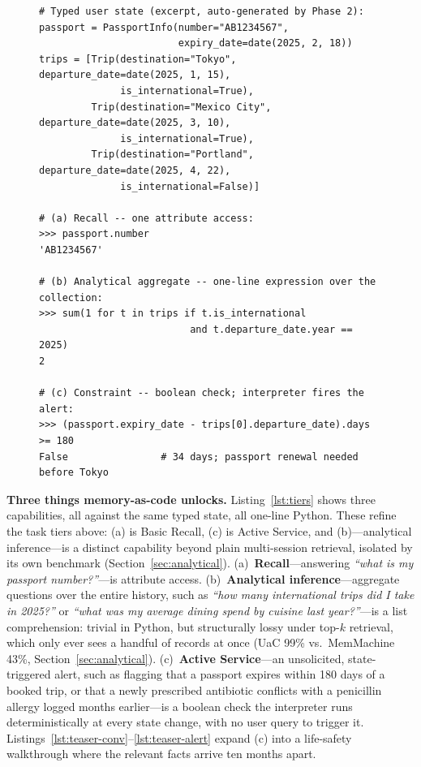 \begin{figure}[htbp]
\begin{lstlisting}[caption={Three capabilities UaC provides, all against the same auto-generated typed state. (a)~Recall is attribute access---what every memory system gives you. (b)~Analytical aggregate is a one-line expression---where retrieval-based systems collapse (Section~\ref{sec:analytical}). (c)~Constraint is a boolean check the interpreter fires on every state change---the basis of the proactive alerts in Section~\ref{sec:active-service}.},label={lst:tiers}]
# Typed user state (excerpt, auto-generated by Phase 2):
passport = PassportInfo(number="AB1234567",
                        expiry_date=date(2025, 2, 18))
trips = [Trip(destination="Tokyo",       departure_date=date(2025, 1, 15),
              is_international=True),
         Trip(destination="Mexico City", departure_date=date(2025, 3, 10),
              is_international=True),
         Trip(destination="Portland",    departure_date=date(2025, 4, 22),
              is_international=False)]

# (a) Recall -- one attribute access:
>>> passport.number
'AB1234567'

# (b) Analytical aggregate -- one-line expression over the collection:
>>> sum(1 for t in trips if t.is_international
                          and t.departure_date.year == 2025)
2

# (c) Constraint -- boolean check; interpreter fires the alert:
>>> (passport.expiry_date - trips[0].departure_date).days >= 180
False                # 34 days; passport renewal needed before Tokyo
\end{lstlisting}
\end{figure}

\textbf{Three things memory-as-code unlocks.} Listing~\ref{lst:tiers} shows three capabilities, all against the same typed state, all one-line Python. These refine the task tiers above: (a) is Basic Recall, (c) is Active Service, and (b)---analytical inference---is a distinct capability beyond plain multi-session retrieval, isolated by its own benchmark (Section~\ref{sec:analytical}). (a)~\textbf{Recall}---answering \emph{``what is my passport number?''}---is attribute access. (b)~\textbf{Analytical inference}---aggregate questions over the entire history, such as \emph{``how many international trips did I take in 2025?''} or \emph{``what was my average dining spend by cuisine last year?''}---is a list comprehension: trivial in Python, but structurally lossy under top-$k$ retrieval, which only ever sees a handful of records at once (UaC 99\% vs.\ MemMachine 43\%, Section~\ref{sec:analytical}). (c)~\textbf{Active Service}---an unsolicited, state-triggered alert, such as flagging that a passport expires within 180 days of a booked trip, or that a newly prescribed antibiotic conflicts with a penicillin allergy logged months earlier---is a boolean check the interpreter runs deterministically at every state change, with no user query to trigger it. Listings~\ref{lst:teaser-conv}--\ref{lst:teaser-alert} expand (c) into a life-safety walkthrough where the relevant facts arrive ten months apart.

